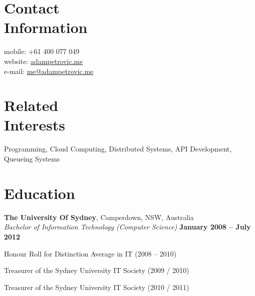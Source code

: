 \documentclass[margin,line]{resume}
\begin{document}
\vspace{2mm}
\begin{resume}

    \section{\mysidestyle Contact\\Information}

    mobile: +61 400 077 049          \vspace{0mm}\\\vspace{0mm}%
    website: \href{http://www.adampetrovic.me}{adampetrovic.me}		\vspace{0mm}\\\vspace{0mm}%
    e-mail: \href{mailto:me@adampetrovic.me}{me@adampetrovic.me}	  \vspace{0mm}\\\vspace{-4.5mm}%
    
    \vspace{2mm}

    \section{\mysidestyle Related\\Interests}

    Programming, Cloud Computing, Distributed Systems, API Development, Queueing Systems


    \section{\mysidestyle Education}

    \textbf{The University Of Sydney}, Camperdown, NSW, Australia \vspace{2mm}\\\vspace{1mm}%
    \textsl{Bachelor of Information Technology (Computer Science)} \hfill \textbf{January 2008 -- July 2012}\vspace{-3mm}\\\vspace{-1mm}%
     \begin{list2}
	\item Honour Roll for Distinction Average in IT (2008 -- 2010)
	\item Treasurer of the Sydney University IT Society (2009 / 2010)
	\item Treasurer of the Sydney University IT Society (2010 / 2011)
     \end{list2}\vspace{-1.5mm}


\end{resume}
\end{document}

